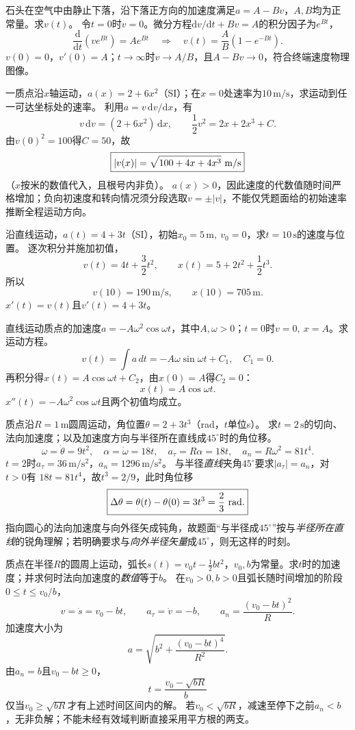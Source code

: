 \problemtext 石头在空气中由静止下落，沿下落正方向的加速度满足$a=A-Bv$，$A,B$均为正常量。求$v(t)$。
\workings
令$t=0$时$v=0$。微分方程$\mathrm dv/\mathrm dt+Bv=A$的积分因子为$e^{Bt}$，
\[
\frac{\mathrm d}{\mathrm dt}(ve^{Bt})=Ae^{Bt}
\quad\Longrightarrow\quad
\boxed{v(t)=\frac AB(1-e^{-Bt})}.
\]
\crosscheck $v(0)=0$，$v'(0)=A$；$t\to\infty$时$v\to A/B$，且$A-Bv\to0$，符合终端速度物理图像。

\problemtext 一质点沿$x$轴运动，$a(x)=2+6x^2$（SI）；在$x=0$处速率为$10\,\mathrm{m/s}$，求运动到任一可达坐标处的速率。
\workings
利用$a=v\,\mathrm dv/\mathrm dx$，有
\[
v\,\mathrm dv=(2+6x^2)\,\mathrm dx,\qquad
\frac12v^2=2x+2x^3+C.
\]
由$v(0)^2=100$得$C=50$，故
\[
\boxed{|v(x)|=\sqrt{100+4x+4x^3}\ {\rm m/s}}
\]
（$x$按米的数值代入，且根号内非负）。
\crosscheck $a(x)>0$，因此速度的代数值随时间严格增加；负向初速度和转向情况须分段选取$v=\pm|v|$，不能仅凭题面给的初始速率推断全程运动方向。

\problemtext 沿直线运动，$a(t)=4+3t$（SI），初始$x_0=5\,\mathrm m,\ v_0=0$，求$t=10\,\mathrm s$的速度与位置。
\workings
逐次积分并施加初值，
\[
v(t)=4t+\frac32t^2,\qquad
x(t)=5+2t^2+\frac12t^3.
\]
所以
\[
\boxed{v(10)=190\,\mathrm{m/s},\qquad x(10)=705\,\mathrm m.}
\]
\crosscheck $x'(t)=v(t)$且$v'(t)=4+3t$。

\problemtext 直线运动质点的加速度$a=-A\omega^2\cos\omega t$，其中$A,\omega>0$；$t=0$时$v=0,\ x=A$。求运动方程。
\workings
\[
v(t)=\int a\,dt=-A\omega\sin\omega t+C_1,\quad C_1=0.
\]
再积分得$x(t)=A\cos\omega t+C_2$，由$x(0)=A$得$C_2=0$：
\[
\boxed{x(t)=A\cos\omega t.}
\]
\crosscheck $x''(t)=-A\omega^2\cos\omega t$且两个初值均成立。

\problemtext 质点沿$R=1\,\mathrm m$圆周运动，角位置$\theta=2+3t^3$（rad，$t$单位s）。
求$t=2\,\mathrm s$的切向、法向加速度；以及加速度方向与半径所在直线成$45^\circ$时的角位移。
\workings
\[
\omega=\dot\theta=9t^2,\quad \alpha=\dot\omega=18t,\quad
a_\tau=R\alpha=18t,\quad a_n=R\omega^2=81t^4.
\]
$t=2$时$a_\tau=36\,\mathrm{m/s^2}$，$a_n=1296\,\mathrm{m/s^2}$。
与半径\emph{直线}夹角$45^\circ$要求$|a_\tau|=a_n$，对$t>0$有
$18t=81t^4$，故$t^3=2/9$，此时角位移
\[
\boxed{\Delta\theta=\theta(t)-\theta(0)=3t^3=\frac23\ {\rm rad}.}
\]
\crosscheck 指向圆心的法向加速度与向外径矢成钝角，故题面“与半径成$45^\circ$”按与\emph{半径所在直线}的锐角理解；若明确要求与\emph{向外半径矢量}成$45^\circ$，则无这样的时刻。

\problemtext 质点在半径$R$的圆周上运动，弧长$s(t)=v_0t-\frac12bt^2$，$v_0,b$为常量。求$t$时的加速度；并求何时法向加速度的\emph{数值}等于$b$。
\workings
在$v_0>0,b>0$且弧长随时间增加的阶段$0\le t\le v_0/b$，
\[
v=\dot s=v_0-bt,\qquad
a_\tau=\dot v=-b,\qquad a_n=\frac{(v_0-bt)^2}{R}.
\]
加速度大小为
\[
a=\sqrt{b^2+\frac{(v_0-bt)^4}{R^2}}.
\]
由$a_n=b$且$v_0-bt\ge0$，
\[
\boxed{t=\frac{v_0-\sqrt{bR}}{b}}
\]
仅当$v_0\ge\sqrt{bR}$才有上述时间区间内的解。
\crosscheck 若$v_0<\sqrt{bR}$，减速至停下之前$a_n<b$，无非负解；不能未经有效域判断直接采用平方根的两支。

